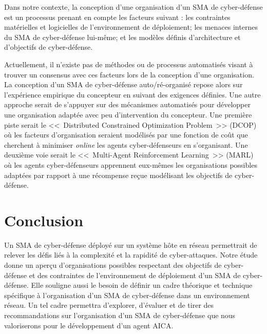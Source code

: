 Dans notre contexte, la conception d'une organisation d'un SMA de cyber-défense est un processus prenant en compte les facteurs suivant : les contraintes matérielles et logicielles de l'environnement de déploiement; 
les menaces internes du SMA de cyber-défense lui-même; et les modèles définis d'architecture et d'objectifs de cyber-défense.

Actuellement, il n'existe pas de méthodes ou de processus automatisés visant à trouver un consensus avec ces facteurs lors de la conception d'une organisation. 
La conception d'un SMA de cyber-défense auto/ré-organisé repose alors sur l'expérience empirique du concepteur en suivant des exigences définies.
Une autre approche serait de s'appuyer sur des mécanismes automatisés pour développer une organisation adaptée avec peu d'intervention du concepteur. 
Une première piste serait le <<~Distributed Constrained Optimization Problem~>> (DCOP) où les facteurs d'organisation seraient modélisés par une fonction de coût que cherchent à minimiser \textit{online} les agents cyber-défenseurs en s'organisant. Une deuxième voie serait le <<~Multi-Agent Reinforcement Learning~>> (MARL) où les agents cyber-défenseurs apprennent eux-mêmes les organisations possibles adaptées par rapport à une récompense reçue modélisant les objectifs de cyber-défense.

\section{Conclusion}
Un SMA de cyber-défense déployé sur un système hôte en réseau permettrait de relever les défis liés à la complexité et la rapidité de cyber-attaques. Notre étude donne un aperçu d'organisations possibles respectant des objectifs de cyber-défense et des contraintes de l'environnement de déploiement d'un SMA de cyber-défense.
Elle souligne aussi le besoin de définir un cadre théorique et technique spécifique à l'organisation d'un SMA de cyber-défense dans un environnement réseau. Un tel cadre permettra d'explorer, d'évaluer et de tirer des recommandations sur l'organisation d'un SMA de cyber-défense que nous valoriserons pour le développement d'un agent AICA.